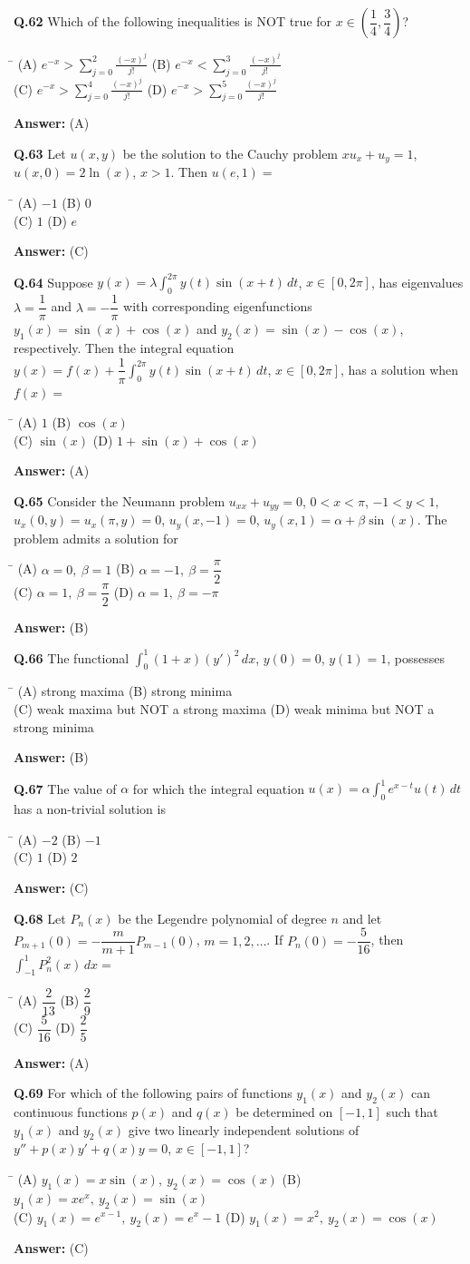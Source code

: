 \documentclass[11pt,a4paper]{article}
\newcommand{\optsfourA}[4]{%
  \begin{tabbing}
    \hspace{0.48\linewidth}\=\kill
    (A) #1 \> (B) #2 \\[2pt]
    (C) #3 \> (D) #4
  \end{tabbing}%
}
\newcommand{\ans}[1]{\textbf{Answer:} #1\par\medskip}
\begin{document}
\textbf{Q.62} Which of the following inequalities is NOT true for $x \in \left(\dfrac{1}{4}, \dfrac{3}{4}\right)$?
\optsfourA{$e^{-x} > \displaystyle\sum_{j=0}^{2} \frac{(-x)^j}{j!}$}{$e^{-x} < \displaystyle\sum_{j=0}^{3} \frac{(-x)^j}{j!}$}{$e^{-x} > \displaystyle\sum_{j=0}^{4} \frac{(-x)^j}{j!}$}{$e^{-x} > \displaystyle\sum_{j=0}^{5} \frac{(-x)^j}{j!}$}
\ans{(A)}

\textbf{Q.63} Let $u(x,y)$ be the solution to the Cauchy problem $x u_x + u_y = 1$, $u(x,0) = 2\ln(x)$, $x > 1$. Then $u(e, 1) =$
\optsfourA{$-1$}{$0$}{$1$}{$e$}
\ans{(C)}

\textbf{Q.64} Suppose $y(x) = \lambda \displaystyle\int_0^{2\pi} y(t)\sin(x + t)\,dt$, $x \in [0, 2\pi]$, has eigenvalues $\lambda = \dfrac{1}{\pi}$ and $\lambda = -\dfrac{1}{\pi}$ with corresponding eigenfunctions $y_1(x) = \sin(x) + \cos(x)$ and $y_2(x) = \sin(x) - \cos(x)$, respectively. Then the integral equation $y(x) = f(x) + \dfrac{1}{\pi}\displaystyle\int_0^{2\pi} y(t)\sin(x + t)\,dt$, $x \in [0, 2\pi]$, has a solution when $f(x) =$
\optsfourA{$1$}{$\cos(x)$}{$\sin(x)$}{$1 + \sin(x) + \cos(x)$}
\ans{(A)}

\textbf{Q.65} Consider the Neumann problem $u_{xx} + u_{yy} = 0$, $0 < x < \pi$, $-1 < y < 1$, $u_x(0,y) = u_x(\pi,y) = 0$, $u_y(x,-1) = 0$, $u_y(x,1) = \alpha + \beta\sin(x)$. The problem admits a solution for
\optsfourA{$\alpha = 0,\ \beta = 1$}{$\alpha = -1,\ \beta = \dfrac{\pi}{2}$}{$\alpha = 1,\ \beta = \dfrac{\pi}{2}$}{$\alpha = 1,\ \beta = -\pi$}
\ans{(B)}

\textbf{Q.66} The functional $\displaystyle\int_0^1 (1 + x)(y')^2\,dx$, $y(0) = 0$, $y(1) = 1$, possesses
\optsfourA{strong maxima}{strong minima}{weak maxima but NOT a strong maxima}{weak minima but NOT a strong minima}
\ans{(B)}

\textbf{Q.67} The value of $\alpha$ for which the integral equation $u(x) = \alpha \displaystyle\int_0^1 e^{x-t} u(t)\,dt$ has a non-trivial solution is
\optsfourA{$-2$}{$-1$}{$1$}{$2$}
\ans{(C)}

\textbf{Q.68} Let $P_n(x)$ be the Legendre polynomial of degree $n$ and let $P_{m+1}(0) = -\dfrac{m}{m + 1}P_{m-1}(0)$, $m = 1, 2, \dots$. If $P_n(0) = -\dfrac{5}{16}$, then $\displaystyle\int_{-1}^{1} P_n^2(x)\,dx =$
\optsfourA{$\dfrac{2}{13}$}{$\dfrac{2}{9}$}{$\dfrac{5}{16}$}{$\dfrac{2}{5}$}
\ans{(A)}

\textbf{Q.69} For which of the following pairs of functions $y_1(x)$ and $y_2(x)$ can continuous functions $p(x)$ and $q(x)$ be determined on $[-1, 1]$ such that $y_1(x)$ and $y_2(x)$ give two linearly independent solutions of $y'' + p(x)y' + q(x)y = 0$, $x \in [-1, 1]$?
\optsfourA{$y_1(x) = x\sin(x),\ y_2(x) = \cos(x)$}{$y_1(x) = x e^x,\ y_2(x) = \sin(x)$}{$y_1(x) = e^{x-1},\ y_2(x) = e^x - 1$}{$y_1(x) = x^2,\ y_2(x) = \cos(x)$}
\ans{(C)}
\end{document}
